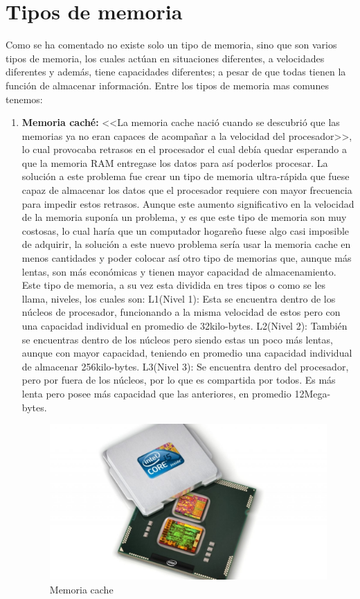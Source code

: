 \documentclass{article}
\begin{document}
\section{Tipos de memoria}
Como se ha comentado no existe solo un tipo de memoria, sino que son varios tipos de memoria, los cuales actúan en situaciones diferentes, a velocidades diferentes y además, tiene capacidades diferentes; a pesar de que todas tienen la función de almacenar información. 
Entre los tipos de memoria mas comunes tenemos:
\begin{enumerate}
\item \textbf{Memoria caché:} <<La memoria cache nació cuando se descubrió que las memorias ya no eran capaces de acompañar a la velocidad del procesador>>\cite{tipos-memoria}, lo cual provocaba retrasos en el procesador el cual debía quedar esperando a que la memoria RAM entregase los datos para así poderlos procesar. La solución a este problema fue crear un tipo de memoria ultra-rápida que fuese capaz de almacenar los datos que el procesador requiere con mayor frecuencia para impedir estos retrasos.
Aunque este aumento significativo en la velocidad de la memoria suponía un problema, y es que este tipo de memoria son muy costosas, lo cual haría que un computador hogareño fuese algo casi imposible de adquirir, la solución a este nuevo problema sería usar la memoria cache en menos cantidades y poder colocar así otro tipo de memorias que, aunque más lentas, son más económicas y tienen mayor capacidad de almacenamiento. 
Este tipo de memoria, a su vez esta dividida en tres tipos o como se les llama, niveles, los cuales son:
\subitem L1(Nivel 1): Esta se encuentra dentro de los núcleos de procesador, funcionando a la misma velocidad de estos pero con una capacidad individual en promedio de 32kilo-bytes.
\subitem L2(Nivel 2): También se encuentras dentro de los núcleos pero siendo estas un poco más lentas, aunque con mayor capacidad, teniendo en promedio una capacidad individual de almacenar 256kilo-bytes.
\subitem L3(Nivel 3): Se encuentra dentro del procesador, pero por fuera de los núcleos, por lo que es compartida por todos. Es más lenta pero posee más capacidad que las anteriores, en promedio 12Mega-bytes. 
    \begin{figure}[h]
        \centering
        \includegraphics[scale=0.25]{Memoria cache.jpg}
        \caption{Memoria cache}
        \label{fig:memoriacachel}
    \end{figure}



\end{enumerate}
\end{document}
